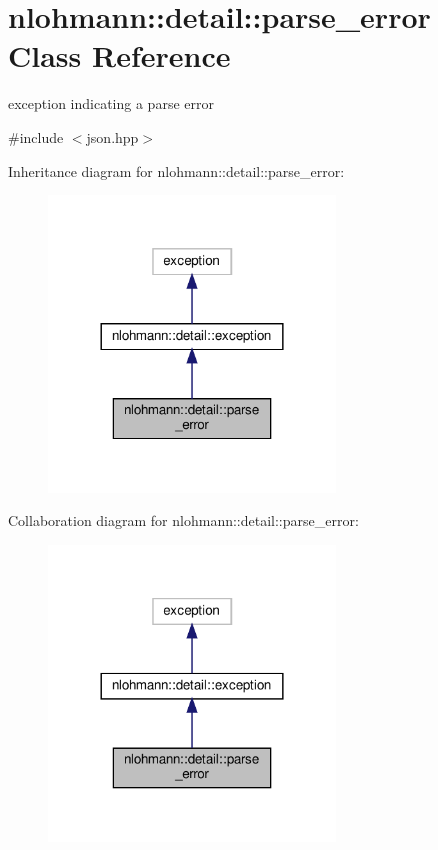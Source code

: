 \hypertarget{classnlohmann_1_1detail_1_1parse__error}{}\section{nlohmann\+:\+:detail\+:\+:parse\+\_\+error Class Reference}
\label{classnlohmann_1_1detail_1_1parse__error}


exception indicating a parse error  




{\ttfamily \#include $<$json.\+hpp$>$}



Inheritance diagram for nlohmann\+:\+:detail\+:\+:parse\+\_\+error\+:
\nopagebreak
\begin{figure}[H]
\begin{center}
\leavevmode
\includegraphics[width=216pt]{classnlohmann_1_1detail_1_1parse__error__inherit__graph}
\end{center}
\end{figure}


Collaboration diagram for nlohmann\+:\+:detail\+:\+:parse\+\_\+error\+:
\nopagebreak
\begin{figure}[H]
\begin{center}
\leavevmode
\includegraphics[width=216pt]{classnlohmann_1_1detail_1_1parse__error__coll__graph}
\end{center}
\end{figure}
